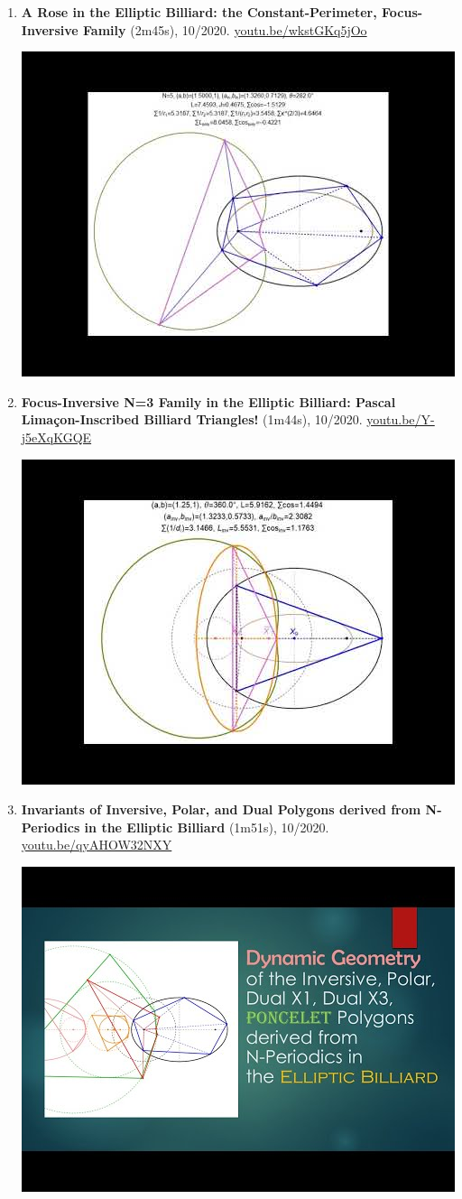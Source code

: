\documentclass[12pt]{article}
\begin{document}
\begin{enumerate}[resume]
% 
\item \textbf{A Rose in the Elliptic Billiard: the Constant-Perimeter, Focus-Inversive Family} (2m45s), 10/2020. \href{https://youtu.be/wkstGKq5jOo}{\url{youtu.be/wkstGKq5jOo}}
\begin{center}\includegraphics[width=.5\textwidth]{pics/wkstGKq5jOo.jpg}\end{center}
% 
\item \textbf{Focus-Inversive N=3 Family in the Elliptic Billiard: Pascal Limaçon-Inscribed Billiard Triangles!} (1m44s), 10/2020. \href{https://youtu.be/Y-j5eXqKGQE}{\url{youtu.be/Y-j5eXqKGQE}}
\begin{center}\includegraphics[width=.5\textwidth]{pics/Y-j5eXqKGQE.jpg}\end{center}
% 
\item \textbf{Invariants of Inversive, Polar, and Dual Polygons derived from N-Periodics in the Elliptic Billiard} (1m51s), 10/2020. \href{https://youtu.be/qyAHOW32NXY}{\url{youtu.be/qyAHOW32NXY}}
\begin{center}\includegraphics[width=.5\textwidth]{pics/qyAHOW32NXY.jpg}\end{center}

\end{enumerate}
\end{document}
